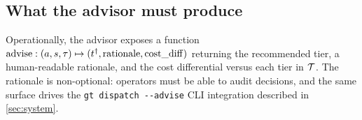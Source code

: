 \subsection{What the advisor must produce}

Operationally, the advisor exposes a function
\(
  \mathrm{advise} : (a, s, \tau) \mapsto (t^\dagger,
  \mathrm{rationale}, \mathrm{cost\_diff})
\)
returning the recommended tier, a human-readable rationale, and the cost
differential versus each tier in $\mathcal{T}$. The rationale is non-optional:
operators must be able to audit decisions, and the same surface drives the
\texttt{gt dispatch \texttt{-{}-}advise} CLI integration described in
\cref{sec:system}.
